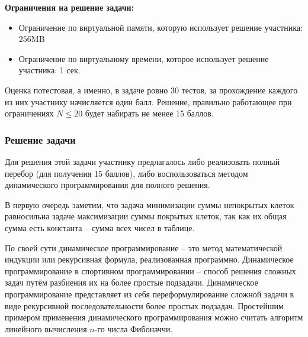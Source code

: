 \documentclass[a4paper]{article}
\begin{document}
\textbf{Ограничения на решение задачи:}
\begin{itemize}
    \item Ограничение по виртуальной памяти, которую использует решение участника: 256MB
    \item Ограничение по виртуальному времени, которое использует решение участника: 1 сек.
\end{itemize}

Оценка потестовая, а именно, в задаче ровно $30$ тестов, за прохождение каждого из них участнику начисляется один балл. Решение, правильно работающее при ограничениях $N \leq 20$ будет набирать не менее 15 баллов.






\subsubsection{Решение задачи}

Для решения этой задачи участнику предлагалось либо реализовать полный перебор (для получения 15 баллов), либо воспользоваться методом динамического программирования для полного решения.

В первую очередь заметим, что задача минимизации суммы непокрытых клеток равносильна задаче максимизации суммы покрытых клеток, так как их общая сумма есть константа -- сумма всех чисел в таблице.

По своей сути динамическое программирование -- это метод математической индукции или рекурсивная формула, реализованная программно. 
Динамическое программирование в спортивном программировании -- способ решения сложных задач путём разбиения их на более простые подзадачи. Динамическое программирование представляет из себя переформулирование сложной задачи в виде рекурсивной последовательности более простых подзадач. Простейшим примером применения динамического программирования можно считать алгоритм линейного вычисления $n$-го числа Фибоначчи.
\end{document}
